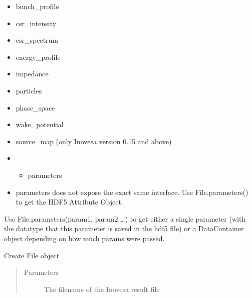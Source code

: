\documentclass[letterpaper,10pt,openany,oneside,english]{sphinxmanual}
\begin{document}
\begin{fulllineitems}
\begin{itemize}
\item {} 
bunch\_profile

\item {} 
csr\_intensity

\item {} 
csr\_spectrum

\item {} 
energy\_profile

\item {} 
impedance

\item {} 
particles

\item {} 
phase\_space

\item {} 
wake\_potential

\item {} 
source\_map (only Inovesa version 0.15 and above)

\item {} \begin{itemize}
\item {} 
parameters

\end{itemize}

\end{itemize}
\begin{itemize}
\item {} 
parameters does not expose the exact same interface. Use File.parameters() to get the HDF5 Attribute Object.

\end{itemize}

Use File.parameters(param1, param2 …) to get either a single parameter (with the datatype that this parameter is saved  
in the hdf5 file) or a DataContainer object depending on how much params were passed.

\begin{fulllineitems}
\label{\detokenize{file:file.File.__init__}}
Create File object
\begin{quote}\begin{description}
\item[{Parameters}] \leavevmode
{} \textendash{} The filename of the Inovesa result file

\end{description}\end{quote}


\end{fulllineitems}
\end{fulllineitems}
\end{document}
